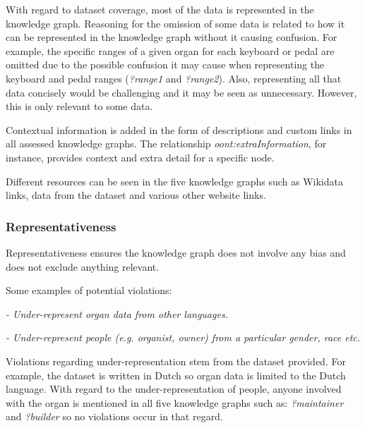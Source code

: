 With regard to dataset coverage, most of the data is represented in the knowledge graph. Reasoning for the omission of some data is related to how it can be represented in the knowledge graph without it causing confusion. For example, the specific ranges of a given organ for each keyboard or pedal are omitted due to the possible confusion it may cause when representing the keyboard and pedal ranges (\textit{?range1} and \textit{?range2}). Also, representing all that data concisely would be challenging and it may be seen as unnecessary. However, this is only relevant to some data. 

Contextual information is added in the form of descriptions and custom links in all assessed knowledge graphs. The relationship \textit{oont:extraInformation}, for instance, provides context and extra detail for a specific node. 

Different resources can be seen in the five knowledge graphs such as Wikidata links, data from the dataset and various other website links. 

\subsubsection{Representativeness}
\hspace{0.5cm} Representativeness ensures the knowledge graph does not involve any bias and does not exclude anything relevant. \cite{knowledgegraphevaulationbook}

\noindent Some examples of potential violations: 

\vspace{-0.1cm}
\begin{displayquote}
    \textit{- Under-represent organ data from other languages.}
\end{displayquote}  
\vspace{-0.6cm}
\begin{displayquote}
     \textit{- Under-represent people (e.g. organist, owner) from a particular gender, race etc. }  
\end{displayquote}
\vspace{-0.1cm}

Violations regarding under-representation stem from the dataset provided. For example, the dataset is written in Dutch so organ data is limited to the Dutch language. With regard to the under-representation of people, anyone involved with the organ is mentioned in all five knowledge graphs such as: \textit{?maintainer} and \textit{?builder} so no violations occur in that regard.

